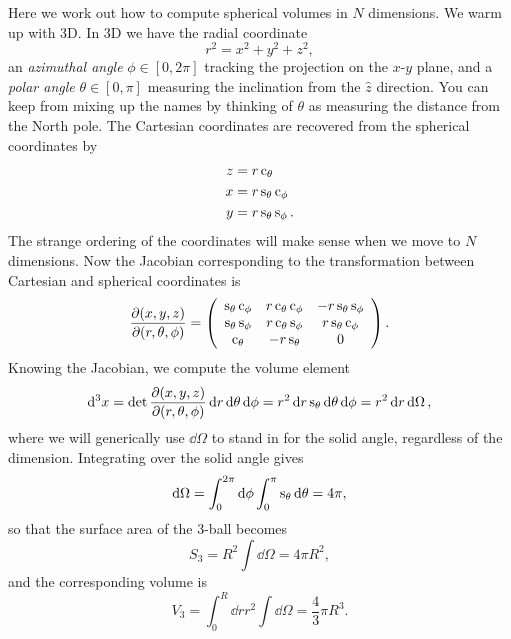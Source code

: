 Here we work out how to compute spherical volumes in $N$ dimensions. 
We warm up with 3D. In 3D we have the radial coordinate
\begin{equation}
  r^2=x^2+y^2+z^2,
\end{equation}
an {\it azimuthal angle} $\phi\in[0,2\pi]$ tracking the projection
on the $x$-$y$ plane, and a {\it polar angle} $\theta\in[0,\pi]$ measuring
the inclination from the $\hat{z}$ direction. 
You can keep from mixing up the
names by thinking of $\theta$ as measuring the distance from the North pole.
The Cartesian coordinates are recovered from the spherical coordinates by
\begin{equation}
  \begin{aligned}
    z&=r\co_\theta\\
    x&=r\s_\theta\co_\phi\\
    y&=r\s_\theta\s_\phi.
  \end{aligned}
\end{equation}
The strange ordering of the coordinates will make sense when we move
to $N$ dimensions. Now the Jacobian corresponding to the transformation between 
Cartesian and spherical coordinates is
\begin{equation}
  \pder[(x,y,z)]{(r,\theta,\phi)}
  =\left(\begin{array}{ccc}
     \s_\theta\co_\phi & r\co_\theta\co_\phi & -r\s_\theta\s_\phi \\
     \s_\theta\s_\phi  & r\co_\theta\s_\phi  & r\s_\theta\co_\phi \\
     \co_\theta        & -r\s_\theta         & 0                  \\ 
   \end{array}\right).
\end{equation}
Knowing the Jacobian, we compute the volume element
\begin{equation}
  \dd[3]{x}=\det\pder[(x,y,z)]{(r,\theta,\phi)}
             \dd{r}\dd{\theta}\dd{\phi}
      =r^2\dd{r}\s_\theta\dd{\theta}\dd{\phi}=r^2\dd{r}\dd{\Omega},
\end{equation}
where we will generically use $\dd\Omega$ to stand in for the solid angle,
regardless of the dimension. Integrating over the solid angle gives
\begin{equation}
  \dd{\Omega}=\int_0^{2\pi}\dd{\phi}\int_0^{\pi}\s_\theta\dd{\theta}=4\pi,
\end{equation}
so that the surface area of the 3-ball becomes
\begin{equation}\label{eq:3ds}
  S_3=R^2\int\dd{\Omega}=4\pi R^2,
\end{equation}
and the corresponding volume is
\begin{equation}\label{eq:3dv}
  V_3=\int_0^R\dd{r}r^2\int\dd{\Omega}=\frac{4}{3}\pi R^3.
\end{equation}

